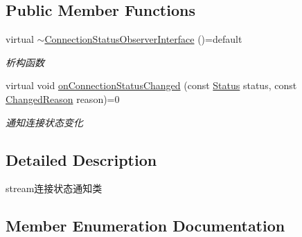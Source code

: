 \subsection*{Public Member Functions}
\begin{DoxyCompactItemize}
\item 
\mbox{\label{classduerOSDcsSDK_1_1sdkInterfaces_1_1ConnectionStatusObserverInterface_a6516004b2e83e23a85b785e9edc6fe13}} 
virtual \hyperlink{classduerOSDcsSDK_1_1sdkInterfaces_1_1ConnectionStatusObserverInterface_a6516004b2e83e23a85b785e9edc6fe13}{$\sim$\+Connection\+Status\+Observer\+Interface} ()=default
\begin{DoxyCompactList}\small\item\em 析构函数 \end{DoxyCompactList}\item 
virtual void \hyperlink{classduerOSDcsSDK_1_1sdkInterfaces_1_1ConnectionStatusObserverInterface_a5184e92a9c0c77dc28a751bc5612b5cc}{on\+Connection\+Status\+Changed} (const \hyperlink{classduerOSDcsSDK_1_1sdkInterfaces_1_1ConnectionStatusObserverInterface_a3e9317c341d07a60d5c5f321495d0b4f}{Status} status, const \hyperlink{classduerOSDcsSDK_1_1sdkInterfaces_1_1ConnectionStatusObserverInterface_a532c8f67d5315b6f0bdef01752463a38}{Changed\+Reason} reason)=0
\begin{DoxyCompactList}\small\item\em 通知连接状态变化 \end{DoxyCompactList}\end{DoxyCompactItemize}


\subsection{Detailed Description}
stream连接状态通知类 

\subsection{Member Enumeration Documentation}
\mbox{\label{classduerOSDcsSDK_1_1sdkInterfaces_1_1ConnectionStatusObserverInterface_a532c8f67d5315b6f0bdef01752463a38}} 
